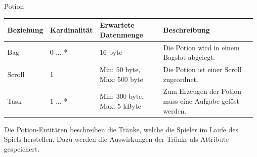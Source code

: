 \begin{entity}{60}{Potion}
\begin{center}
	\begin{longtable}{|m{4cm}|m{}|m{}|m{}|}
 	 \hline
 	 \textbf{Beziehung} & \textbf{Kardinalität} &  \textbf{Erwartete Datenmenge} & \textbf{Beschreibung} \\
  	\hline
  	Bag & 0 ... *  & 16 byte & Die Potion wird in einem Bagslot abgelegt.\\
	  \hline
  	Scroll & 1  & Min: 50 byte, Max: 500 byte & Die Potion ist einer Scroll zugeordnet. \\
	  \hline
  	Task & 1 ... *  & Min: 300 byte, Max: 5 kByte & Zum Erzeugen der Potion muss eine Aufgabe gelöst werden.\\
	  \hline
	\end{longtable}
\end{center}
Die \glqq Potion\grqq-Entitäten beschreiben die Tränke, welche die Spieler im Laufe des Spiels herstellen. Dazu werden die Auswirkungen der Tränke als Attribute gespeichert. \\\\\\\
\end{entity}

